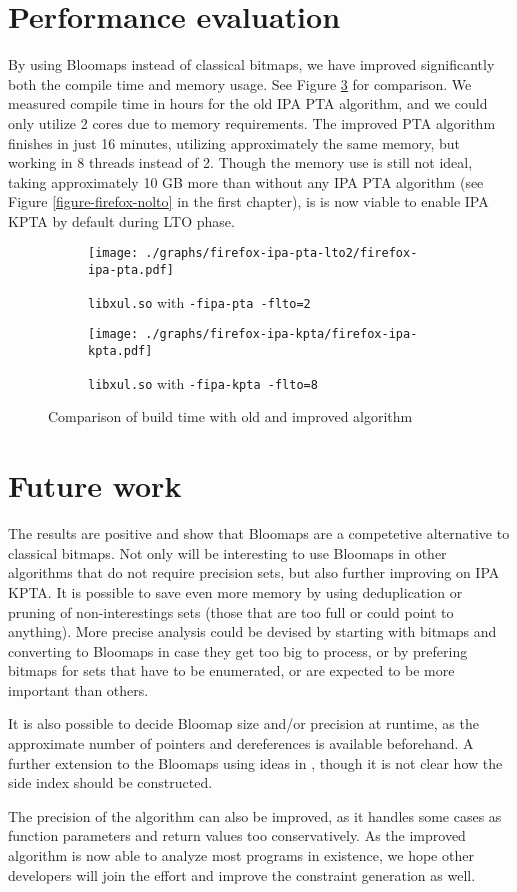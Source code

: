 \section{Performance evaluation}

By using Bloomaps instead of classical bitmaps, we have improved significantly
both the compile time and memory usage. See Figure
\ref{figure-new-old-comparison} for comparison. We measured compile time in
hours for the old IPA PTA algorithm, and we could only utilize 2 cores due to
memory requirements. The improved PTA algorithm finishes in just 16 minutes,
utilizing approximately the same memory, but working in 8 threads instead of 2.
Though the memory use is still not ideal, taking approximately 10 GB more than
without any IPA PTA algorithm (see Figure \ref{figure-firefox-nolto} in the
first chapter), is is now viable to enable IPA KPTA by default during LTO
phase.

\begin{figure}[h!]
\begin{subfigure}[b]{\textwidth}
	\centering
	\texttt{[image: ./graphs/firefox-ipa-pta-lto2/firefox-ipa-pta.pdf]}
	\caption{{\tt libxul.so} with {\tt -fipa-pta -flto=2}}
	\label{figure-firefox-ipa-pta-lto2-2}
\end{subfigure}
\begin{subfigure}[b]{\textwidth}
	\centering
	\texttt{[image: ./graphs/firefox-ipa-kpta/firefox-ipa-kpta.pdf]}
	\caption{{\tt libxul.so} with {\tt -fipa-kpta -flto=8}}
	\label{figure-firefox-ipa-kpta}
\end{subfigure}
\caption{Comparison of build time with old and improved algorithm}
	\label{figure-new-old-comparison}
\end{figure}

\section{Future work}

The results are positive and show that Bloomaps are a competetive alternative
to classical bitmaps. Not only will be interesting to use Bloomaps in other
algorithms that do not require precision sets, but also further improving on IPA
KPTA. It is possible to save even more memory by using deduplication or pruning
of non-interestings sets (those that are too full or could point to anything).
More precise analysis could be devised by starting with bitmaps and converting
to Bloomaps in case they get too big to process, or by prefering bitmaps for
sets that have to be enumerated, or are expected to be more important than others.

It is also possible to decide Bloomap size and/or precision at runtime, as the
approximate number of pointers and dereferences is available beforehand. A
further extension to the Bloomaps using ideas in \cite{Guo06thedynamic}, though it
is not clear how the side index should be constructed.

The precision of the algorithm can also be improved, as it handles some cases
as function parameters and return values too conservatively. As the improved
algorithm is now able to analyze most programs in existence, we hope other
developers will join the effort and improve the constraint generation as well.

